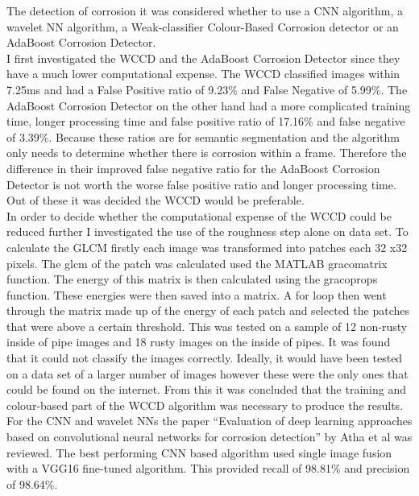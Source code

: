 \documentclass[11pt]{article}		%
\begin{document}
        The detection of corrosion it was considered whether to use a CNN algorithm, a wavelet NN algorithm, a Weak-classifier Colour-Based Corrosion detector or an AdaBoost Corrosion Detector.
        \\
        I first investigated the WCCD and the AdaBoost Corrosion Detector since they have a much lower computational expense. 
        The WCCD classified images within 7.25ms and had a False Positive ratio of 9.23\% and False Negative of 5.99\%. 
        The AdaBoost Corrosion Detector on the other hand had a more complicated training time, longer processing time and false positive ratio of 17.16\% and false negative of 3.39\%. 
        Because these ratios are for semantic segmentation and the algorithm only needs to determine whether there is corrosion within a frame. 
        Therefore the difference in their improved false negative ratio for the AdaBoost Corrosion Detector is not worth the worse false positive ratio and longer processing time. 
        Out of these it was decided the WCCD would be preferable.
        \\
        In order to decide whether the computational expense of the WCCD could be reduced further I investigated the use of the roughness step alone on data set. 
        To calculate the GLCM firstly each image was transformed into patches each 32 x32 pixels. 
        The glcm of the patch was calculated used the MATLAB gracomatrix function.
        The energy of this matrix is then calculated using the gracoprops function. 
        These energies were then saved into a matrix. 
        A for loop then went through the matrix made up of the energy of each patch and selected the patches that were above a certain threshold. 
        This was tested on a sample of 12 non-rusty inside of pipe images and 18 rusty images on the inside of pipes. 
        It was found that it could not classify the images correctly.
        Ideally, it would have been tested on a data set of a larger number of images however these were the only ones that could be found on the internet. 
        From this it was concluded that the training and colour-based part of the WCCD algorithm was necessary to produce the results.
        \\
        For the CNN and wavelet NNs the paper “Evaluation of deep learning approaches based on convolutional neural networks for corrosion detection” by Atha et al was reviewed. 
        The best performing CNN based algorithm used single image fusion with a VGG16 fine-tuned algorithm. 
        This provided recall of 98.81\% and precision of 98.64\%. 
\end{document}
